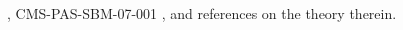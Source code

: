 \documentclass{cimento}
\begin{document}
\begin{thebibliography}{0}



 ,
 CMS-PAS-SBM-07-001
 , and references on the theory therein.


\end{thebibliography}
\end{document}
